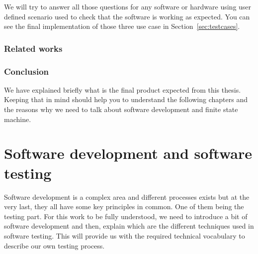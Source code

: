 \documentclass[12pt]{article}
\theoremstyle{definition}
\theoremstyle{definition}
\theoremstyle{remark}
\begin{document}
We will try to answer all those questions for any software or hardware using user defined scenario used to check that the software is working as expected. You can see the final implementation of those three use case in Section~\ref{sec:testcases}.



\section{Related works}




\section{Conclusion}


We have explained briefly what is the final product expected from this thesis. Keeping that in mind should help you to understand the following chapters and the reasons why we need to talk about software development and finite state machine.




\clearpage
\part{Software development and software testing}

Software development is a complex area and different processes exists but at the very last, they all have some key principles in common. One of them being the testing part. For this work to be fully understood, we need to introduce a bit of software development and then, explain which are the different techniques used in software testing. This will provide us with the required technical vocabulary to describe our own testing process.
\end{document}
